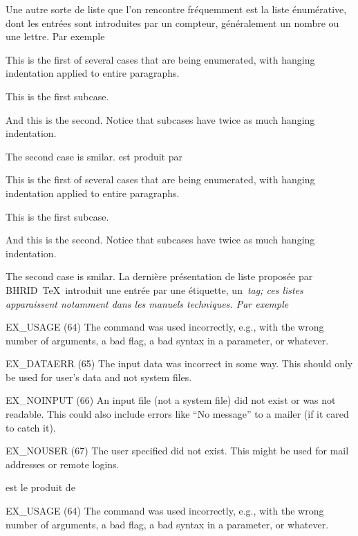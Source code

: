 Une autre sorte de liste que l'on rencontre fréquemment est la liste
énumérative, dont les entrées sont introduites par un compteur,
généralement un nombre ou une lettre. Par exemple
\begindisplay
{}
\beginlist\enum\1
\item This is the first of several cases that are being enumerated,
      with hanging indentation applied to entire paragraphs.
\beginlist\enum\a
\item This is the first subcase.
\item And this is the second. Notice that subcases have twice as much
      hanging indentation.
\endlist
\item The second case is smilar.
\endlist
\enddisplay
est produit par
\begincode
{}
\beginlist\enum\1
\item This is the first of several cases that are being enumerated,
      with hanging indentation applied to entire paragraphs.
\beginlist\enum\a
\item This is the first subcase.
\item And this is the second. Notice that subcases have twice as much
      hanging indentation.
\endlist
\item The second case is smilar.
\endlist
\endcode
La dernière présentation de liste proposée par BHRID~\TeX\ introduit
une entrée par une étiquette, un~\em{tag}; ces listes apparaissent
notamment dans les manuels techniques. Par exemple
\begindisplay
{}
\beginlist\tag
\item{EX\_USAGE (64)}
The command was used incorrectly, e.g., with the wrong number of
arguments, a bad flag, a bad syntax in a parameter, or whatever.

\item{EX\_DATAERR (65)}
The input data was incorrect in some way.  This should only be used
for user's data and not system files.

\item{EX\_NOINPUT (66)}
An input file (not a system file) did not exist or was not readable.
This could also include errors like ``No message'' to a mailer (if it
cared to catch it).

\item{EX\_NOUSER (67)}
The user specified did not exist.  This might be used for mail
addresses or remote logins.

\endlist
\enddisplay
est le produit de
\begincode
{}
\beginlist\tag
\item{EX\_USAGE (64)}
The command was used incorrectly, e.g., with the wrong number of
arguments, a bad flag, a bad syntax in a parameter, or whatever.

